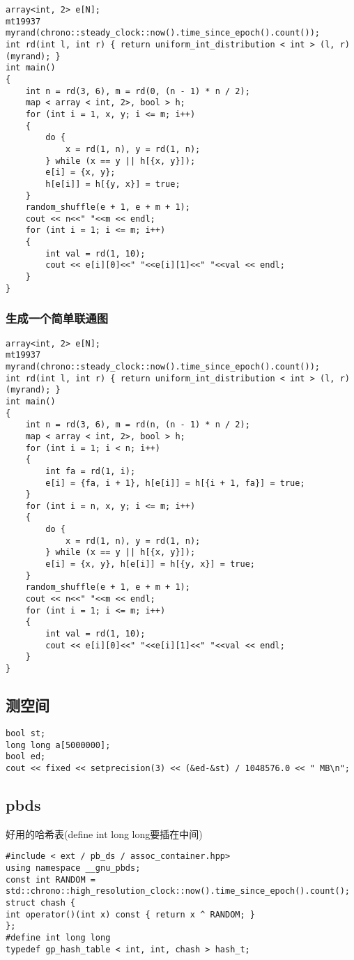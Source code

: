 \documentclass[a4paper,fontset=none]{ctexart}
\begin{document}
\begin{verbatim}
array<int, 2> e[N];
mt19937 myrand(chrono::steady_clock::now().time_since_epoch().count());
int rd(int l, int r) { return uniform_int_distribution < int > (l, r)(myrand); }
int main()
{
    int n = rd(3, 6), m = rd(0, (n - 1) * n / 2);
    map < array < int, 2>, bool > h;
    for (int i = 1, x, y; i <= m; i++)
    {
        do {
            x = rd(1, n), y = rd(1, n);
        } while (x == y || h[{x, y}]);
        e[i] = {x, y};
        h[e[i]] = h[{y, x}] = true;
    }
    random_shuffle(e + 1, e + m + 1);
    cout << n<<" "<<m << endl;
    for (int i = 1; i <= m; i++)
    {
        int val = rd(1, 10);
        cout << e[i][0]<<" "<<e[i][1]<<" "<<val << endl;
    }
}
\end{verbatim}
\subsubsection{生成一个简单联通图}

\begin{verbatim}
array<int, 2> e[N];
mt19937 myrand(chrono::steady_clock::now().time_since_epoch().count());
int rd(int l, int r) { return uniform_int_distribution < int > (l, r)(myrand); }
int main()
{
    int n = rd(3, 6), m = rd(n, (n - 1) * n / 2);
    map < array < int, 2>, bool > h;
    for (int i = 1; i < n; i++)
    {
        int fa = rd(1, i);
        e[i] = {fa, i + 1}, h[e[i]] = h[{i + 1, fa}] = true;
    }
    for (int i = n, x, y; i <= m; i++)
    {
        do {
            x = rd(1, n), y = rd(1, n);
        } while (x == y || h[{x, y}]);
        e[i] = {x, y}, h[e[i]] = h[{y, x}] = true;
    }
    random_shuffle(e + 1, e + m + 1);
    cout << n<<" "<<m << endl;
    for (int i = 1; i <= m; i++)
    {
        int val = rd(1, 10);
        cout << e[i][0]<<" "<<e[i][1]<<" "<<val << endl;
    }
}
\end{verbatim}
\subsection{测空间}

\begin{verbatim}
bool st;
long long a[5000000];
bool ed;
cout << fixed << setprecision(3) << (&ed-&st) / 1048576.0 << " MB\n";
\end{verbatim}
\subsection{pbds}
好用的哈希表(define int long long要插在中间)
\begin{verbatim}
#include < ext / pb_ds / assoc_container.hpp>
using namespace __gnu_pbds;
const int RANDOM = std::chrono::high_resolution_clock::now().time_since_epoch().count();
struct chash {
int operator()(int x) const { return x ^ RANDOM; }
};
#define int long long
typedef gp_hash_table < int, int, chash > hash_t;
\end{verbatim}
\end{document}
